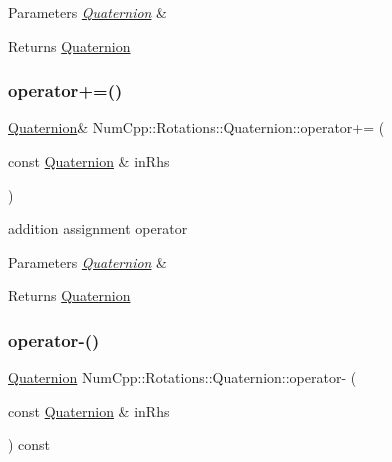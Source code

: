\begin{DoxyParams}{Parameters}
{\em \mbox{\hyperlink{class_num_cpp_1_1_rotations_1_1_quaternion}{Quaternion}}} & \\
\hline
\end{DoxyParams}
\begin{DoxyReturn}{Returns}
\mbox{\hyperlink{class_num_cpp_1_1_rotations_1_1_quaternion}{Quaternion}} 
\end{DoxyReturn}
\mbox{\label{class_num_cpp_1_1_rotations_1_1_quaternion_ae38581ed3b06acb8aca2eaf8774d6ba9}} 
\subsubsection{\texorpdfstring{operator+=()}{operator+=()}}
{\footnotesize\ttfamily \mbox{\hyperlink{class_num_cpp_1_1_rotations_1_1_quaternion}{Quaternion}}\& Num\+Cpp\+::\+Rotations\+::\+Quaternion\+::operator+= (\begin{DoxyParamCaption}\item[{const \mbox{\hyperlink{class_num_cpp_1_1_rotations_1_1_quaternion}{Quaternion}} \&}]{in\+Rhs }\end{DoxyParamCaption})\hspace{0.3cm}{\ttfamily [inline]}}

addition assignment operator


\begin{DoxyParams}{Parameters}
{\em \mbox{\hyperlink{class_num_cpp_1_1_rotations_1_1_quaternion}{Quaternion}}} & \\
\hline
\end{DoxyParams}
\begin{DoxyReturn}{Returns}
\mbox{\hyperlink{class_num_cpp_1_1_rotations_1_1_quaternion}{Quaternion}} 
\end{DoxyReturn}
\mbox{\label{class_num_cpp_1_1_rotations_1_1_quaternion_ab01ead254d02e77ebb4f9de7b9e54436}} 
\subsubsection{\texorpdfstring{operator-\/()}{operator-()}}
{\footnotesize\ttfamily \mbox{\hyperlink{class_num_cpp_1_1_rotations_1_1_quaternion}{Quaternion}} Num\+Cpp\+::\+Rotations\+::\+Quaternion\+::operator-\/ (\begin{DoxyParamCaption}\item[{const \mbox{\hyperlink{class_num_cpp_1_1_rotations_1_1_quaternion}{Quaternion}} \&}]{in\+Rhs }\end{DoxyParamCaption}) const\hspace{0.3cm}{\ttfamily [inline]}}

